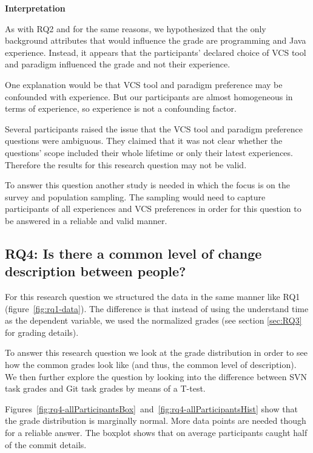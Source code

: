 \documentclass[letterpaper]{article}
\begin{document}


\textbf{Interpretation}

As with RQ2 and for the same reasons, we hypothesized that the only background attributes that would influence the grade are programming and Java experience.
Instead, it appears that the participants' declared choice of VCS tool and paradigm influenced the grade and not their experience.

One explanation would be that VCS tool and paradigm preference may be confounded with experience.
But our participants are almost homogeneous in terms of experience, so experience is not a confounding factor.

Several participants raised the issue that the VCS tool and paradigm preference questions were ambiguous.
They claimed that it was not clear whether the questions' scope included their whole lifetime or only their latest experiences.
Therefore the results for this research question may not be valid.

To answer this question another study is needed in which the focus is on the survey and population sampling.
The sampling would need to capture participants of all experiences and VCS preferences in order for this question to be answered in a reliable and valid manner.

\subsection{RQ4: Is there a common level of change description between people?}
\label{seq:rq4}

For this research question we structured the data in the same manner like RQ1 (figure~\ref{fig:rq1-data}).
The difference is that instead of using the understand time as the dependent variable, we used the normalized grades (see section \ref{sec:RQ3} for grading details).

To answer this research question we look at the grade distribution in order to see how the common grades look like (and thus, the common level of description).
We then further explore the question by looking into the difference between SVN task grades and Git task grades by means of a T-test.

Figures~\ref{fig:rq4-allParticipantsBox}~and~\ref{fig:rq4-allParticipantsHist} show that the grade distribution is marginally normal.
More data points are needed though for a reliable answer.
The boxplot shows that on average participants caught half of the commit details.
\end{document}
